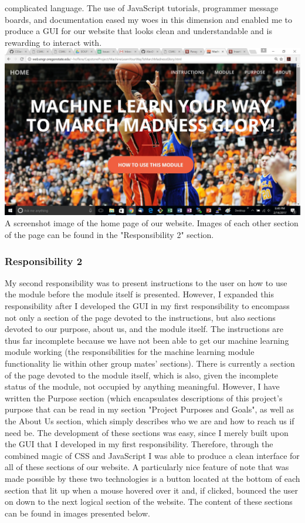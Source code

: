 \documentclass[letterpaper, 10pt,titlepage]{article}
\begin{document}
complicated language. The use of JavaScript tutorials, programmer message boards, and documentation eased my woes in this dimension and enabled me to produce a GUI for our website that looks clean and understandable and is rewarding to interact with.
\includegraphics[width=\textwidth]{dv.jpg}
A screenshot image of the home page of our website. Images of each other section of the page can be found in the "Responsibility 2" section.

\subsubsection{Responsibility 2}
My second responsibility was to present instructions to the user on how to use the module before the module itself is presented. However, I expanded this responsibility after I developed the GUI in my first responsibility to encompass not only a section of the page devoted to the instructions, but also sections devoted to our purpose, about us, and the module itself. The instructions are thus far incomplete because we have not been able to get our machine learning module working (the responsibilities for the machine learning module functionality lie within other group mates' sections). There is currently a section of the page devoted to the module itself, which is also, given the incomplete status of the module, not occupied by anything meaningful. However, I have written the Purpose section (which encapsulates descriptions of this project's purpose that can be read in my section "Project Purposes and Goals", as well as the About Us section, which simply describes who we are and how to reach us if need be. The development of these sections was easy, since I merely built upon the GUI that I developed in my first responsibility. Therefore, through the combined magic of CSS and JavaScript I was able to produce a clean interface for all of these sections of our website. A particularly nice feature of note that was made possible by these two technologies is a button located at the bottom of each section that lit up when a mouse hovered over it and, if clicked, bounced the user on down to the next logical section of the website. The content of these sections can be found in images presented below.
\end{document}
